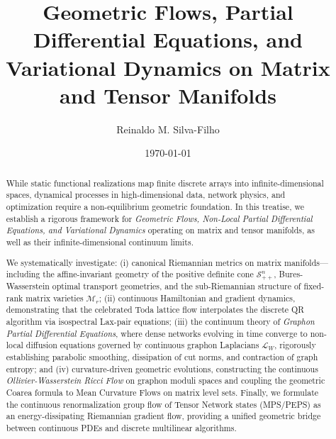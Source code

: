 \documentclass[11pt,a4paper,reqno]{amsart}
\title[Geometric Flows on Matrix and Tensor Manifolds]{Geometric Flows, Partial Differential Equations, and Variational Dynamics on Matrix and Tensor Manifolds}
\author{Reinaldo M. Silva-Filho}
\date{\today}
\theoremstyle{definition}
\numberwithin{equation}{section}
\begin{document}
\begin{abstract}
While static functional realizations map finite discrete arrays into infinite-dimensional spaces, dynamical processes in high-dimensional data, network physics, and optimization require a non-equilibrium geometric foundation. In this treatise, we establish a rigorous framework for \emph{Geometric Flows, Non-Local Partial Differential Equations, and Variational Dynamics} operating on matrix and tensor manifolds, as well as their infinite-dimensional continuum limits. 

We systematically investigate: (i) canonical Riemannian metrics on matrix manifolds---including the affine-invariant geometry of the positive definite cone $\mathcal{S}_{++}^n$, Bures-Wasserstein optimal transport geometries, and the sub-Riemannian structure of fixed-rank matrix varieties $\mathcal{M}_r$; (ii) continuous Hamiltonian and gradient dynamics, demonstrating that the celebrated Toda lattice flow interpolates the discrete QR algorithm via isospectral Lax-pair equations; (iii) the continuum theory of \emph{Graphon Partial Differential Equations}, where dense networks evolving in time converge to non-local diffusion equations governed by continuous graphon Laplacians $\mathcal{L}_W$, rigorously establishing parabolic smoothing, dissipation of cut norms, and contraction of graph entropy; and (iv) curvature-driven geometric evolutions, constructing the continuous \emph{Ollivier-Wasserstein Ricci Flow} on graphon moduli spaces and coupling the geometric Coarea formula to Mean Curvature Flows on matrix level sets. Finally, we formulate the continuous renormalization group flow of Tensor Network states (MPS/PEPS) as an energy-dissipating Riemannian gradient flow, providing a unified geometric bridge between continuous PDEs and discrete multilinear algorithms.
\end{abstract}


\maketitle

\tableofcontents

\newpage

\end{document}
